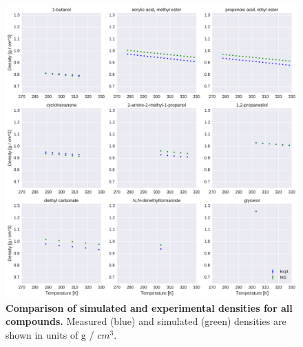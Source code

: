 \documentclass[aip, jcp, reprint]{revtex4-1}  %
\begin{document}
\begin{figure}[alldensity]

\includegraphics[width=\textwidth]{./figures/densities_versus_temperature_part0.pdf}

\caption{{\bf Comparison of simulated and experimental densities for all compounds.} 
Measured (blue) and simulated (green) densities are shown in units of g / $cm^{3}$.
\label{figure:AllDensities}
}

\end{figure}
\end{document}
